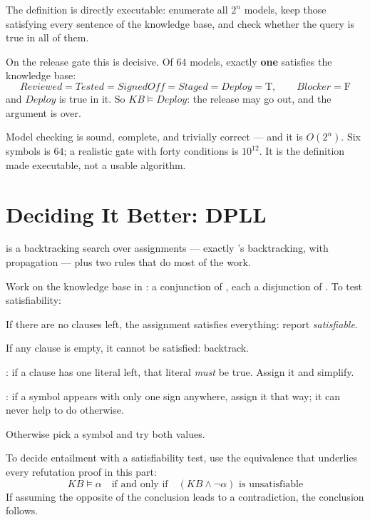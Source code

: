 The definition is directly executable: enumerate all $2^{n}$ models, keep those
satisfying every sentence of the knowledge base, and check whether the query is true
in all of them.

On the release gate this is decisive. Of $64$ models, exactly \textbf{one} satisfies
the knowledge base:
\[
  \mathit{Reviewed} = \mathit{Tested} = \mathit{SignedOff} = \mathit{Staged}
  = \mathit{Deploy} = \text{T}, \qquad \mathit{Blocker} = \text{F}
\]
and $\mathit{Deploy}$ is true in it. So $\mathit{KB} \models \mathit{Deploy}$: the
release may go out, and the argument is over.

Model checking is sound, complete, and trivially correct --- and it is $O(2^{n})$.
Six symbols is $64$; a realistic gate with forty conditions is $10^{12}$. It is the
definition made executable, not a usable algorithm.

\section{Deciding It Better: DPLL}

 is a backtracking search over assignments --- exactly 's
backtracking, with propagation --- plus two rules that do most of the work.

\begin{definitionbox}[DPLL]
Work on the knowledge base in : a conjunction of
, each a disjunction of . To test satisfiability:
\begin{tight}
  \item If there are no clauses left, the assignment satisfies everything: report
        \emph{satisfiable}.
  \item If any clause is empty, it cannot be satisfied: backtrack.
  \item {}: if a clause has one literal left, that literal
        \emph{must} be true. Assign it and simplify.
  \item {}: if a symbol appears with only one sign anywhere,
        assign it that way; it can never help to do otherwise.
  \item Otherwise pick a symbol and try both values.
\end{tight}
\end{definitionbox}

To decide entailment with a satisfiability test, use the equivalence that underlies
every refutation proof in this part:
\[
  \mathit{KB} \models \alpha
  \quad\text{if and only if}\quad
  (\mathit{KB} \wedge \neg\alpha) \text{ is unsatisfiable}
\]
If assuming the opposite of the conclusion leads to a contradiction, the conclusion
follows.

